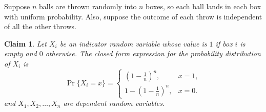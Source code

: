 \documentclass{article}
\newtheorem{claim}{Claim}
\begin{document}
Suppose $n$ balls are thrown randomly into $n$ boxes, so each ball lands in each box with uniform probability. 
Also, suppose the outcome of each throw is independent of all the other throws.

\begin{claim}
    Let $X_i$ be an indicator random variable whose value is $1$ if box $i$ is empty and $0$ otherwise. The 
    closed form expression for the probability distribution of $X_i$ is 
    \[
    \Pr\{X_i = x\} =
    \begin{cases}
    \left(1 - \frac{1}{n}\right)^n, & x = 1, \\[6pt]
    1 - \left(1 - \frac{1}{n}\right)^n, & x = 0.
    \end{cases}
    \]
    and $X_1, X_2, \dots, X_n$ are dependent random variables.
\end{claim}
\end{document}
